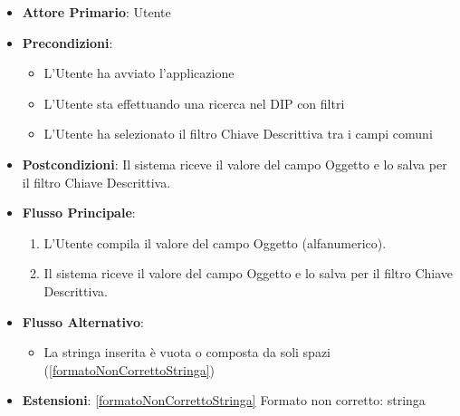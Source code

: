 \label{addValoreOggetto}
\begin{itemize}
      \item \textbf{Attore Primario}: Utente
      \item \textbf{Precondizioni}: 
      \begin{itemize}
            \item L'Utente ha avviato l'applicazione
            \item L'Utente sta effettuando una ricerca nel DIP con filtri
            \item L'Utente ha selezionato il filtro Chiave Descrittiva tra i campi comuni
      \end{itemize}
      \item \textbf{Postcondizioni}: Il sistema riceve il valore del campo Oggetto e lo salva per il filtro Chiave Descrittiva.
      \item \textbf{Flusso Principale}:
      \begin{enumerate}
            \item L'Utente compila il valore del campo Oggetto (alfanumerico).
            \item Il sistema riceve il valore del campo Oggetto e lo salva per il filtro Chiave Descrittiva.
      \end{enumerate}
      \item \textbf{Flusso Alternativo}:
      \begin{itemize}
            \item La stringa inserita è vuota o composta da soli spazi (\ref{formatoNonCorrettoStringa})
      \end{itemize}
      \item \textbf{Estensioni}: \ref{formatoNonCorrettoStringa} Formato non corretto: stringa
\end{itemize}

